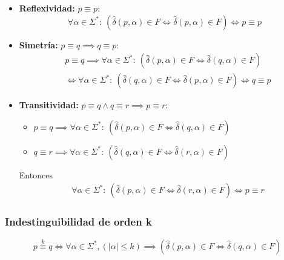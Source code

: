 \begin{demo}[\textwidth]
  \begin{itemize}
    \item \textbf{Reflexividad:} \(p\equiv p\):
          \[ \forall \alpha \in \Sigma^*:~(\hat\delta(p,\alpha) \in F \iff \hat\delta(p,\alpha) \in F) \iff p \equiv p \]
    \item \textbf{Simetría:} \(p\equiv q \implies q\equiv p\):
          \begin{align*}
             & p \equiv q \implies \forall \alpha \in \Sigma^*:~(\hat\delta(p,\alpha) \in F \iff \hat\delta(q,\alpha) \in F)  \\
             & \iff \forall \alpha \in \Sigma^*:~(\hat\delta(q,\alpha) \in F \iff \hat\delta(p,\alpha) \in F) \iff q \equiv p
          \end{align*}
    \item \textbf{Transitividad:} \(p\equiv q \land q\equiv r \implies p\equiv r\):
          \begin{itemize}
            \item[] \(p \equiv q \implies \forall \alpha \in \Sigma^*:~(\hat\delta(p,\alpha) \in F \iff \hat\delta(q,\alpha) \in F)\)
            \item[] \(q \equiv r \implies \forall \alpha \in \Sigma^*:~(\hat\delta(q,\alpha) \in F \iff \hat\delta(r,\alpha) \in F)\)
          \end{itemize}
          Entonces
          \begin{align*}
             & \forall \alpha \in \Sigma^*:~(\hat\delta(p,\alpha) \in F \iff \hat\delta(r,\alpha) \in F) \iff p \equiv r
          \end{align*}
  \end{itemize}
\end{demo}

\subsubsection{Indestinguibilidad de orden k}
\[ p \overset{k}{\equiv} q \iff \forall \alpha\in\Sigma^*, (|\alpha|\leq k) \implies (\hat\delta(p,\alpha) \in F \iff \hat\delta(q,\alpha) \in F)\]

